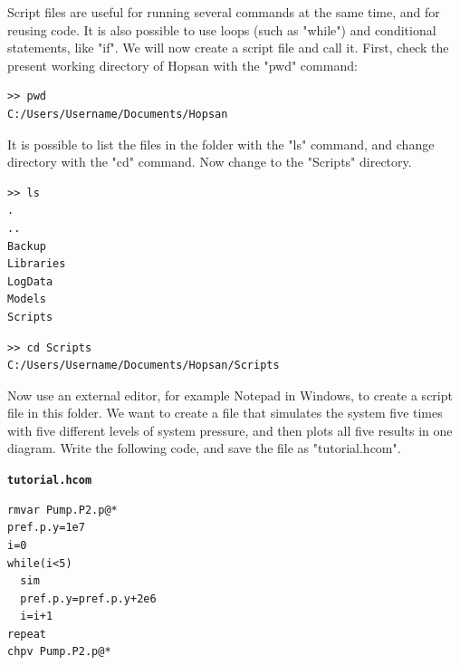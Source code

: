 \documentclass[a4paper,pdftex]{article}
\begin{document}
\begin{enumerate}
Script files are useful for running several commands at the same time, and for reusing code. It is also possible to use loops (such as "while") and conditional statements, like "if". We will now create a script file and call it. First, check the present working directory of Hopsan with the "pwd" command:

\vspace{5pt}\hspace{10pt}
\begin{minipage}{0.5\linewidth}
\begin{verbatim}
>> pwd
C:/Users/Username/Documents/Hopsan
\end{verbatim}
\end{minipage}
\vspace{5pt}

It is possible to list the files in the folder with the "ls" command, and change directory with the "cd" command. Now change to the "Scripts" directory.

\vspace{5pt}\hspace{10pt}
\begin{minipage}{0.5\linewidth}
\begin{verbatim}
>> ls
.
..
Backup
Libraries
LogData
Models
Scripts
\end{verbatim}
\end{minipage}
\vspace{5pt}

\vspace{5pt}\hspace{10pt}
\begin{minipage}{0.5\linewidth}
\begin{verbatim}
>> cd Scripts
C:/Users/Username/Documents/Hopsan/Scripts
\end{verbatim}
\end{minipage}
\vspace{5pt}

Now use an external editor, for example Notepad in Windows, to create a script file in this folder. We want to create a file that simulates the system five times with five different levels of system pressure, and then plots all five results in one diagram. Write the following code, and save the file as "tutorial.hcom".

\vspace{5pt}
\texttt{\textbf{tutorial.hcom}}
\vspace{3pt}\\
\hspace{10pt}
\begin{minipage}{0.4\linewidth}
\begin{framed}
\begin{verbatim}
rmvar Pump.P2.p@*
pref.p.y=1e7
i=0
while(i<5)
  sim
  pref.p.y=pref.p.y+2e6
  i=i+1
repeat
chpv Pump.P2.p@*
\end{verbatim}%
\vspace{-10pt}
\end{framed}
\end{minipage}
\vspace{5pt}


\end{enumerate}
\end{document}
